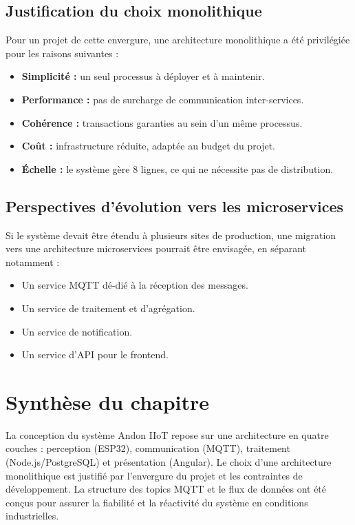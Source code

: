 \subsection{Justification du choix monolithique}

Pour un projet de cette envergure, une architecture monolithique a \'et\'e privil\'egi\'ee pour les raisons suivantes :

\begin{itemize}
    \item \textbf{Simplicit\'e :} un seul processus \`a d\'eployer et \`a maintenir.
    \item \textbf{Performance :} pas de surcharge de communication inter-services.
    \item \textbf{Coh\'erence :} transactions garanties au sein d'un m\^eme processus.
    \item \textbf{Co\^ut :} infrastructure r\'eduite, adapt\'ee au budget du projet.
    \item \textbf{\'Echelle :} le syst\`eme g\`ere 8 lignes, ce qui ne n\'ecessite pas de distribution.
\end{itemize}

\subsection{Perspectives d'\'evolution vers les microservices}

Si le syst\`eme devait \^etre \'etendu \`a plusieurs sites de production, une migration vers une architecture microservices pourrait \^etre envisag\'ee, en s\'eparant notamment :

\begin{itemize}
    \item Un service MQTT d\'e-di\'e \`a la r\'eception des messages.
    \item Un service de traitement et d'agr\'egation.
    \item Un service de notification.
    \item Un service d'API pour le frontend.
\end{itemize}

\section{Synth\`ese du chapitre}

La conception du syst\`eme Andon IIoT repose sur une architecture en quatre couches : perception (ESP32), communication (MQTT), traitement (Node.js/PostgreSQL) et pr\'esentation (Angular). Le choix d'une architecture monolithique est justifi\'e par l'envergure du projet et les contraintes de d\'eveloppement. La structure des topics MQTT et le flux de donn\'ees ont \'et\'e con\c{c}us pour assurer la fiabilit\'e et la r\'eactivité du syst\`eme en conditions industrielles.
